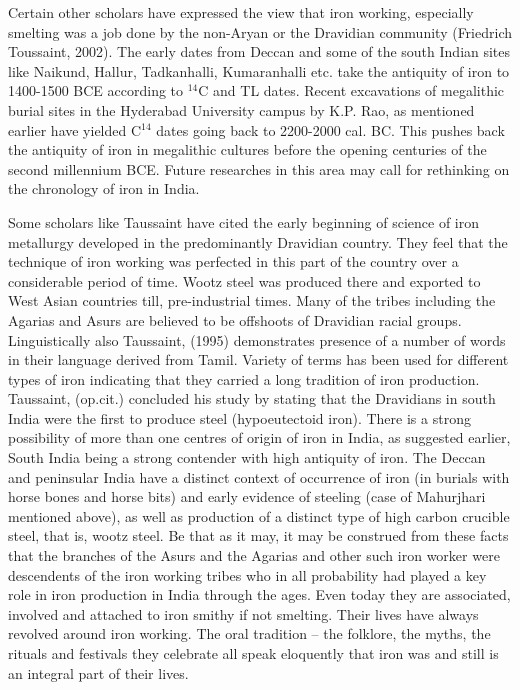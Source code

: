 Certain other scholars have expressed the view that iron working, especially smelting was a job done by the non-Aryan or the Dravidian community (Friedrich Toussaint, 2002). The early dates from Deccan and some of the south Indian sites like Naikund, Hallur, Tadkanhalli, Kumaranhalli etc. take the antiquity of iron to 1400-1500 BCE according to ${}^{14}$C and TL dates. Recent excavations of megalithic burial sites in the Hyderabad University campus by K.P. Rao, as mentioned earlier have yielded C$^{14}$ dates going back to 2200-2000 cal. BC. This pushes back the antiquity of iron in megalithic cultures before the opening centuries of the second millennium BCE. Future researches in this area may call for rethinking on the chronology of iron in India.

Some scholars like Taussaint have cited the early beginning of science of iron metallurgy developed in the predominantly Dravidian country. They feel that the technique of iron working was perfected in this part of the country over a considerable period of time. Wootz steel was produced there and exported to West Asian countries till, pre-industrial times. Many of the tribes including the Agarias and Asurs are believed to be offshoots of Dravidian racial groups. Linguistically also Taussaint, (1995) demonstrates presence of a number of words in their language derived from Tamil. Variety of terms has been used for different types of iron indicating that they carried a long tradition of iron production. Taussaint, (op.cit.) concluded his study by stating that the Dravidians in south India were the first to produce steel (hypoeutectoid iron). There is a strong possibility of more than one centres of origin of iron in India, as suggested earlier, South India being a strong contender with high antiquity of iron. The Deccan and peninsular India have a distinct context of occurrence of iron (in burials with horse bones and horse bits) and early evidence of steeling (case of Mahurjhari mentioned above), as well as production of a distinct type of high carbon crucible steel, that is, wootz steel. Be that as it may, it may be construed from these facts that the branches of the Asurs and the Agarias and other such iron worker were descendents of the iron working tribes who in all probability had played a key role in iron production in India through the ages. Even today they are associated, involved and attached to iron smithy if not smelting. Their lives have always revolved around iron working. The oral tradition – the folklore, the myths, the rituals and festivals they celebrate all speak eloquently that iron was and still is an integral part of their lives. 

